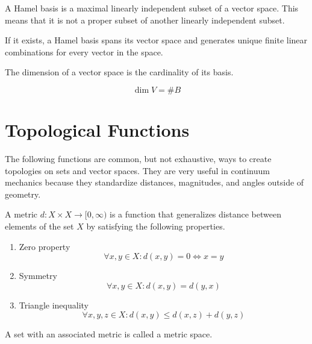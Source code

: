 \begin{definition}
	A Hamel basis is a maximal linearly independent subset of a vector space. This means that it is not a proper subset of another linearly independent subset.
\end{definition}

If it exists, a Hamel basis spans its vector space and generates unique finite linear combinations for every vector in the space.

\begin{definition}[Dimension]
	The dimension of a vector space is the cardinality of its basis.
	
	\begin{equation}
		\dim{V} = \# B
	\end{equation}
\end{definition}

\section{Topological Functions}

The following functions are common, but not exhaustive, ways to create topologies on sets and vector spaces. They are very useful in continuum mechanics because they standardize distances, magnitudes, and angles outside of geometry.

\begin{definition}[Metric]
	A metric $d: X \times X \rightarrow [0, \infty)$ is a function that generalizes distance between elements of the set $X$ by satisfying the following properties.
	\begin{enumerate}
		\item Zero property
		\begin{equation}
			\forall x, y \in X: d(x, y) = 0 \iff x = y
		\end{equation}
		\item Symmetry
		\begin{equation}
			\forall x, y \in X: d(x, y) = d(y, x)
		\end{equation}
		\item Triangle inequality
		\begin{equation}
			\forall x, y, z \in X: d(x, y) \leq d(x, z) + d(y, z)
		\end{equation}
	\end{enumerate}
\end{definition}

A set with an associated metric is called a metric space.

